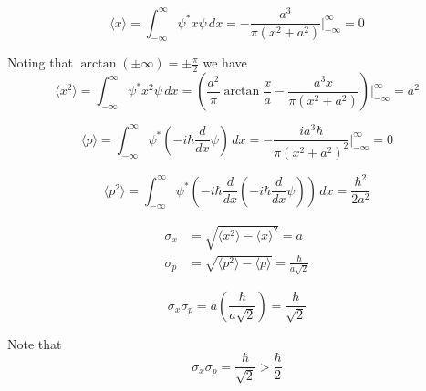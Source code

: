 


\begin{equation*}
\langle x\rangle=\int_{-\infty}^\infty\psi^*x\psi\,dx
=-\frac{a^3}{\pi(x^2+a^2)}\bigg|_{-\infty}^\infty=0
\end{equation*}

Noting that $\arctan(\pm\infty)=\pm\frac{\pi}{2}$ we have
\begin{equation*}
\langle x^2\rangle=\int_{-\infty}^\infty\psi^*x^2\psi\,dx
=\left(\frac{a^2}{\pi}\arctan\frac{x}{a}
-\frac{a^3x}{\pi(x^2+a^2)}\right)\bigg|_{-\infty}^\infty
=a^2
\end{equation*}

\begin{equation*}
\langle p\rangle
=\int_{-\infty}^\infty\psi^*\left(-i\hbar\frac{d}{dx}\psi\right)\,dx
=-\frac{ia^3\hbar}{\pi\left(x^2+a^2\right)^2}\bigg|_{-\infty}^\infty
=0
\end{equation*}

\begin{equation*}
\langle p^2\rangle
=\int_{-\infty}^\infty\psi^*\left(-i\hbar\frac{d}{dx}
\left(-i\hbar\frac{d}{dx}\psi\right)\right)\,dx
=\frac{\hbar^2}{2a^2}
\end{equation*}

\begin{align*}
\sigma_x&=\sqrt{\langle x^2\rangle-\langle x\rangle^2}=a
\\
\sigma_p&=\sqrt{\langle p^2\rangle-\langle p\rangle}
=\frac{\hbar}{a\sqrt2}
\end{align*}

\begin{equation*}
\sigma_x\sigma_p=a\left(\frac{\hbar}{a\sqrt2}\right)
=\frac{\hbar}{\sqrt2}
\end{equation*}

Note that
\begin{equation*}
\sigma_x\sigma_p=\frac{\hbar}{\sqrt2}>\frac{\hbar}{2}
\end{equation*}


